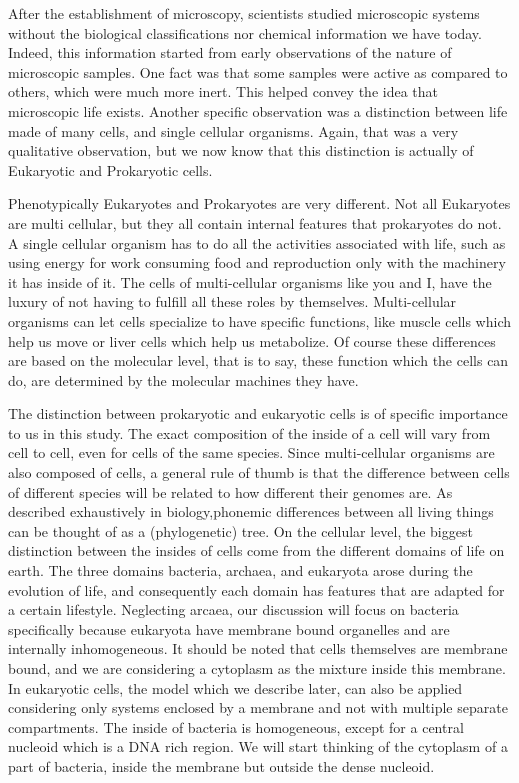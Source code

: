 \documentclass{article}
\begin{document}
After the establishment of microscopy, scientists studied microscopic systems without the biological classifications nor chemical information we have today. Indeed, this information started from early observations of the nature of microscopic samples. One fact was that some samples were active as compared to others, which were much more inert. This helped convey the idea that microscopic life exists. Another specific observation was a distinction between life made of many cells, and single cellular organisms. Again, that was a very qualitative observation, but we now know that this distinction is actually of Eukaryotic and Prokaryotic cells.

Phenotypically Eukaryotes and Prokaryotes are very different. Not all Eukaryotes are multi cellular, but they all contain internal features that prokaryotes do not. A single cellular organism has to do all the activities associated with life, such as using energy for work consuming food and reproduction only with the machinery it has inside of it. The cells of multi-cellular organisms like you and I, have the luxury of not having to fulfill all these roles by themselves. Multi-cellular organisms can let cells specialize to have specific functions, like muscle cells which help us move or liver cells which help us metabolize. Of course these differences are based on the molecular level, that is to say, these function which the cells can do, are determined by the molecular machines they have.

The distinction between prokaryotic and eukaryotic cells is of specific importance to us in this study. The exact composition of the inside of a cell will vary from cell to cell, even for cells of the same species. Since multi-cellular organisms are also composed of cells, a general rule of thumb is that the difference between cells of different species will be related to how different their genomes are. As described exhaustively in biology,phonemic differences between all living things can be thought of as a (phylogenetic) tree. On the cellular level, the biggest distinction between the insides of cells come from the different domains of life on earth. The three domains bacteria, archaea, and eukaryota arose during the evolution of life, and consequently each domain has features that are adapted for a certain lifestyle. Neglecting arcaea, our discussion will focus on bacteria specifically because eukaryota have membrane bound organelles and are internally inhomogeneous. It should be noted that cells themselves are membrane bound, and we are considering a cytoplasm as the mixture inside this membrane. In eukaryotic cells, the model which we describe later, can also be applied considering only systems enclosed by a membrane and not with multiple separate compartments. The inside of bacteria is homogeneous, except for a central nucleoid which is a DNA rich region. We will start thinking of the cytoplasm of a part of bacteria, inside the membrane but outside the dense nucleoid.
\end{document}

